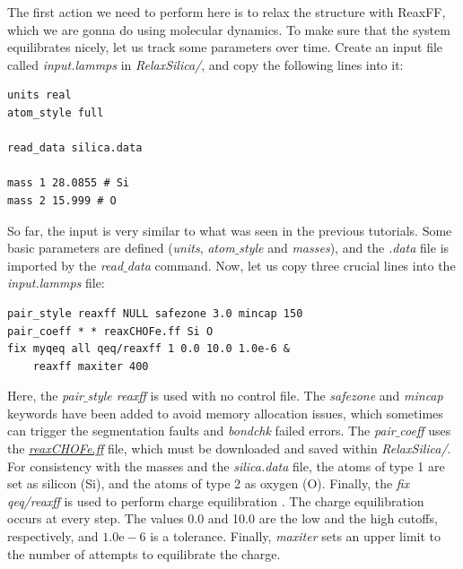 \documentclass[9pt,tutorial]{livecoms}
\begin{document}
The first action we need to perform here is to relax the structure with ReaxFF, which we are gonna do using molecular dynamics. To make sure that the system equilibrates nicely, let us track some parameters over time. Create an input file called \textit{input.lammps} in \textit{RelaxSilica/}, and copy the following lines into it:
{\normalsize \begin{verbatim}
units real
atom_style full

read_data silica.data

mass 1 28.0855 # Si
mass 2 15.999 # O
\end{verbatim}}
So far, the input is very similar to what was seen in the previous tutorials. Some basic parameters are defined (\textit{units}, \textit{atom$\_$style} and \textit{masses}), and the \textit{.data} file is imported by the \textit{read$\_$data} command. Now, let us copy three crucial lines into the \textit{input.lammps} file:
{\normalsize \begin{verbatim}
pair_style reaxff NULL safezone 3.0 mincap 150
pair_coeff * * reaxCHOFe.ff Si O
fix myqeq all qeq/reaxff 1 0.0 10.0 1.0e-6 &
    reaxff maxiter 400
\end{verbatim}}
Here, the \textit{pair$\_$style reaxff} is used with no control file. The \textit{safezone} and \textit{mincap} keywords have been added to avoid memory allocation issues, which sometimes can trigger the segmentation faults and \textit{bondchk} failed errors. The \textit{pair$\_$coeff} uses the \href{https://raw.githubusercontent.com/lammpstutorials/lammpstutorials-article/main/files/tutorial5/reaxCHOFe.ff}{\textit{reaxCHOFe.ff}} file, which must be downloaded and saved within \textit{RelaxSilica/}. For consistency with the masses and the \textit{silica.data} file, the atoms of type 1 are set as silicon (Si), and the atoms of type 2 as oxygen (O). Finally, the \textit{fix qeq/reaxff} is used to perform charge equilibration \cite{rappe1991charge}. The charge equilibration occurs at every step. The values 0.0 and 10.0 are the low and the high cutoffs, respectively, and $1.0 \text{e} -6$ is a tolerance. Finally, \textit{maxiter} sets an upper limit to the number of attempts to equilibrate the charge.
\end{document}
